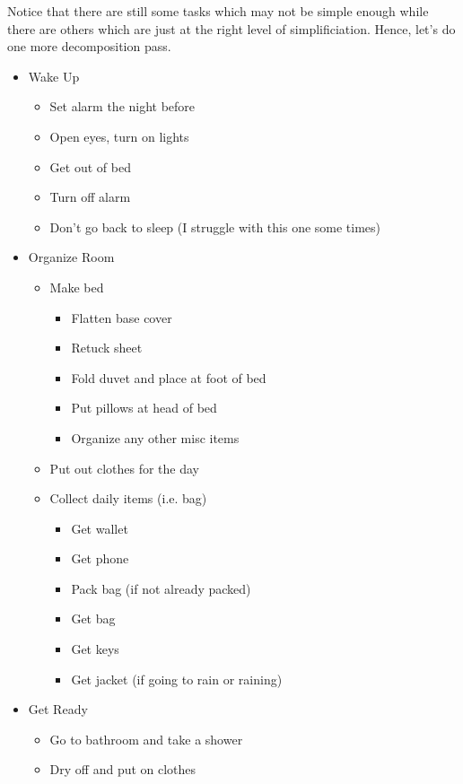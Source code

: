 \documentclass[12pt,a4paper]{book}
\begin{document}
			Notice that there are still some tasks which may not be simple enough while there are others which are just at the right level of simplificiation. Hence, let's do one more decomposition pass.
		
			\begin{itemize}
				\item Wake Up
					\begin{itemize}
						\item Set alarm the night before
						\item Open eyes, turn on lights
						\item Get out of bed
						\item Turn off alarm
						\item Don't go back to sleep (I struggle with this one some times)
					\end{itemize}
				\item Organize Room
					\begin{itemize}
						\item Make bed
							\begin{itemize}
								\item Flatten base cover
								\item Retuck sheet
								\item Fold duvet and place at foot of bed
								\item Put pillows at head of bed 
								\item Organize any other misc items
							\end{itemize}
						\item Put out clothes for the day
						\item Collect daily items (i.e. bag)
							\begin{itemize}
								\item Get wallet
								\item Get phone
								\item Pack bag (if not already packed)
								\item Get bag
								\item Get keys
								\item Get jacket (if going to rain or raining)
							\end{itemize}
					\end{itemize}
				\item Get Ready
					\begin{itemize}
						\item Go to bathroom and take a shower
						\item Dry off and put on clothes

\end{itemize}
\end{itemize}
\end{document}
